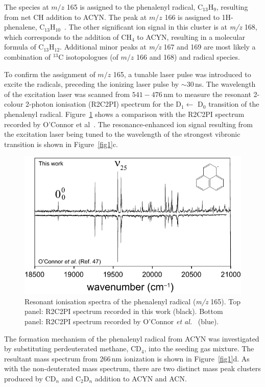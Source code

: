\documentclass[journal=jacsat,manuscript=article,layout=onecolumn]{achemso}
\begin{document}
The species at $m/z$ 165 is assigned to the phenalenyl radical, C$_{13}$H$_9$, resulting from net CH addition to ACYN. The peak at $m/z$ 166 is assigned to 1H-phenalene, C$_{13}$H$_{10}$~\cite{oco17}. The other significant ion signal in this cluster is at \textit{m/z} 168, which corresponds to the addition of CH$_4$ to ACYN, resulting in a molecular formula of C$_{13}$H$_{12}$. Additional minor peaks at \textit{m/z} 167 and 169 are most likely a combination of $^{13}$C isotopologues (of $m/z$ 166 and 168) and radical species.

To confirm the assignment of $m/z$ 165, a tunable laser pulse was introduced to excite the radicals, preceding the ionizing laser pulse by $\sim$30\,ns. The wavelength of the excitation laser was scanned from $541-476$\,nm to measure the resonant 2-colour 2-photon ionisation (R2C2PI) spectrum for the D$_1 \leftarrow$ D$_0$ transition of the phenalenyl radical. Figure~\ref{fig2} shows a comparison with the R2C2PI spectrum recorded by O’Connor et al~\cite{oco11}. The resonance-enhanced ion signal resulting from the excitation laser being tuned to the wavelength of the strongest vibronic transition is shown in Figure~\ref{fig1}c.

\begin{figure} [h!]
	\includegraphics[width=15cm]{Figures/Figure2}
	\caption{Resonant ionisation spectra of the phenalenyl radical (\textit{m/z} 165). Top panel: R2C2PI spectrum recorded in this work (black). Bottom panel: R2C2PI spectrum recorded by O'Connor \textit{et al.}~\cite{oco11} (blue).}
	\label{fig2}
\end{figure}

The formation mechanism of the phenalenyl radical from ACYN was investigated by substituting perdeuterated methane, CD$_4$, into the seeding gas mixture. The resultant mass spectrum from 266\,nm ionization is shown in Figure~\ref{fig1}d. As with the non-deuterated mass spectrum, there are two distinct mass peak clusters produced by CD$_n$ and C$_2$D$_n$ addition to ACYN and ACN.
\end{document}
